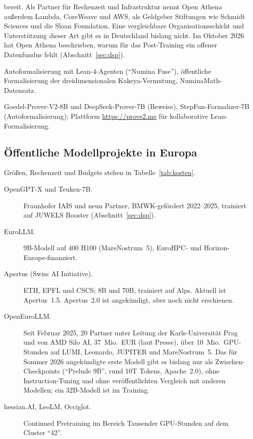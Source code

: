 \documentclass[a4paper,11pt]{article}
\begin{document}
\begin{description}
  bereit.  Als Partner für Rechenzeit und Infrastruktur nennt Open
  Athena außerdem Lambda, CoreWeave und AWS, als Geldgeber Stiftungen
  wie Schmidt Sciences und die Sloan Foundation.  Eine vergleichbare
  Organisationsschicht und Unterstützung dieser Art gibt es in
  Deutschland bislang nicht.  Im Oktober 2026 hat Open Athena
  beschrieben, warum für das Post-Training ein offener Datenfundus
  fehlt (Abschnitt~\ref{sec:dsp}).
\item[Project Numina (Pietro Pellegrino).]
  Autoformalisierung mit Lean-4-Agenten (\enquote{Numina Fuse}),
  öffentliche Formalisierung der dreidimensionalen Kakeya-Vermutung,
  NuminaMath-Datensatz.
\item[Prover- und Formalisierungsmodelle.]
  Goedel-Prover-V2-8B und DeepSeek-Prover-7B (Beweise),
  StepFun-Formalizer-7B (Autoformalisierung); Plattform
  \url{https://prove2.me} für kollaborative Lean-Formalisierung.
\end{description}

\subsection{Öffentliche Modellprojekte in Europa}

Größen, Rechenzeit und Budgets stehen in Tabelle~\ref{tab:kosten}.

\begin{description}
\item[OpenGPT-X und Teuken-7B.] Fraunhofer IAIS und neun Partner,
  BMWK-gefördert 2022--2025, trainiert auf JUWELS Booster
  (Abschnitt~\ref{sec:dsp}).
\item[EuroLLM.] 9B-Modell auf 400 H100 (MareNostrum~5), EuroHPC- und
  Horizon-Europe-finanziert.
\item[Apertus (Swiss AI Initiative).] ETH, EPFL und CSCS; 8B und 70B,
  trainiert auf Alps. Aktuell ist Apertus~1.5.  Apertus~2.0 ist
  angekündigt, aber noch nicht erschienen.
\item[OpenEuroLLM.] Seit Februar 2025, 20 Partner unter Leitung der
  Karls-Universität Prag und von AMD Silo AI, 37~Mio.\ EUR (laut
  Presse), über 10~Mio.\ GPU-Stunden auf LUMI, Leonardo, JUPITER und
  MareNostrum~5. Das für Sommer 2026 angekündigte erste Modell gibt es
  bislang nur als Zwischen-Checkpoints (\enquote{Prelude 9B}, rund 10T
  Tokens, Apache~2.0), ohne Instruction-Tuning und ohne
  veröffentlichten Vergleich mit anderen Modellen; ein 32B-Modell ist
  im Training.
\item[hessian.AI, LeoLM, Occiglot.] Continued Pretraining im Bereich
  Tausender GPU-Stunden auf dem Cluster \enquote{42}.
\end{description}
\end{document}
